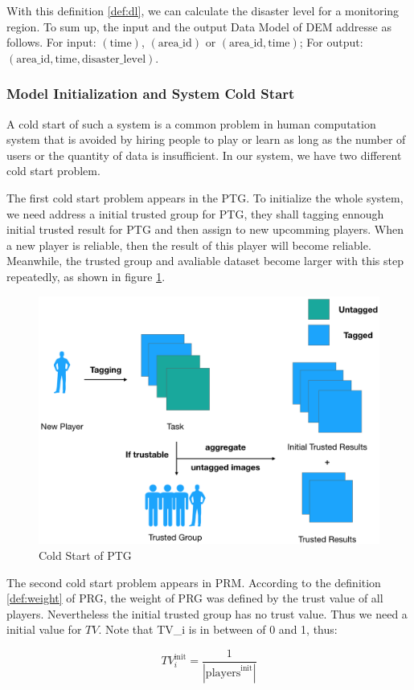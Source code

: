   With this definition \ref{def:dl}, we can calculate the disaster level for a monitoring region.
  To sum up, the input and the output Data Model of DEM addresse as follows. For input:
  $(\text{time})$, $(\text{area\_id})$ or $(\text{area\_id}, \text{time})$; For output:
  $(\text{area\_id}, \text{time}, \text{disaster\_level})$.

  \subsubsection{Model Initialization and System Cold Start}

  A cold start of such a system is a common problem in human computation system that 
  is avoided by hiring people to play or learn as long as 
  the number of users or the quantity of data is insufficient.
  In our system, we have two different cold start problem.

  The first cold start problem appears in the PTG. To initialize the whole system, we need
  address a initial trusted group for PTG, they shall tagging ennough initial trusted result
  for PTG and then assign to new upcomming players. When a new player is reliable,
  then the result of this player will become reliable. Meanwhile, the trusted group and avaliable 
  dataset become larger with this step repeatedly, as shown in figure \ref{fig:cold}.

  \begin{figure}[htp]
  \centering
  \includegraphics[width=0.5\columnwidth]{figures/coldstart}
  \caption{Cold Start of PTG}
  \label{fig:cold}
  \end{figure}

  The second cold start problem appears in PRM. According to the definition \ref{def:weight} of PRG, the weight
  of PRG was defined by the trust value of all players. Nevertheless the initial trusted group has
  no trust value. Thus we need a initial value for $TV$. Note that TV\_i is in between of 0 and 1, thus:

  \[
  TV_{i}^{\text{init}} = \frac{1}{|\text{players}^{\text{init}}|}
  \]

